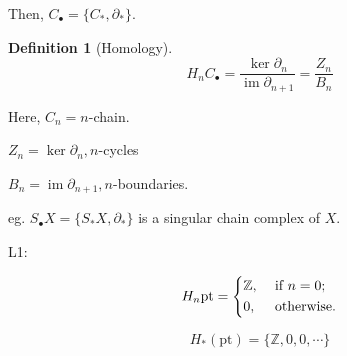 \documentclass{article}
\theoremstyle{definition}
\newtheorem*{definition}{Definition}
\begin{document}
    Then, \(C_\bullet = \{ C_{\ast}, \partial_{\ast} \}\).

    \begin{definition}
        [Homology]

        \[
            H_n C_\bullet = \frac{\ker \partial_n}{\operatorname{im} \partial_{n+1}} = \frac{Z_n}{B_n}
        \]

        Here, \(C_n = n\)-chain.
        
        \(Z_n = \ker \partial_n, n\)-cycles
        
        \(B_n = \operatorname{im} \partial_{n+1}, n\)-boundaries.

        eg. \(S_\bullet X = \{ S_{\ast} X, \partial_{\ast} \}\) is a singular chain complex of \(X\).
    \end{definition}

    L1:

    \[
        H_n \text{pt} = \begin{dcases}
            \mathbb{Z}, &\text{ if } n=0 ;\\
            0, &\text{ otherwise} .
        \end{dcases}
    \]

    \[
        H_{\ast} (\text{pt}) = \{ \mathbb{Z},0,0,\cdots \}
    \]
\end{document}
